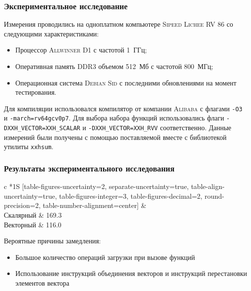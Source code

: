 \documentclass[aspectratio=169]{beamer}
\begin{document}
\begin{frame}
	\frametitle{Экспериментальное исследование}
	Измерения проводились на одноплатном компьютере \textsc{Sipeed Lichee RV 86} со следующими характеристиками:
	\begin{itemize}
		\item Процессор \textsc{Allwinner D1} с частотой 1~ГГц;
		\item Оперативная память \textsc{DDR3} объемом 512~Мб с частотой 800~МГц;
		\item Операционная система \textsc{Debian Sid} с последними обновлениями на момент тестирования.
	\end{itemize}

	Для компиляции использовался компилятор от компании \textsc{Alibaba} с флагами \texttt{-O3} и \texttt{-march=rv64gcv0p7}.
	Для выбора набора функций использовались флаги \texttt{-DXXH\_VECTOR=XXH\_SCALAR} и \texttt{-DXXH\_VECTOR=XXH\_RVV} соответственно.
	Данные измерений были получены с помощью поставляемой вместе с библиотекой утилиты \texttt{xxhsum}.
\end{frame}

\begin{frame}
	\frametitle{Результаты экспериментального исследования}
	\begin{table}[h]
		\def\arraystretch{1.1}  %
		\setlength\tabcolsep{0.2em}
		\centering
		\caption{Сравнение производительности хеш-функции  на входных данных размером в 1000~Кб; числа приведены с относительной погрешностью 0.1\%}
		\begin{tabular}[C]{
				c
				*1{S
							[table-figures-uncertainty=2, separate-uncertainty=true, table-align-uncertainty=true,
								table-figures-integer=3, table-figures-decimal=2, round-precision=2,
								table-number-alignment=center]
					}
			}
			\toprule
			 &  \\ \midrule
			Скалярный & 169.3 \\ \midrule
			Векторный & 116.0 \\
			\bottomrule
		\end{tabular}
		\label{tab:speed}
	\end{table}

	Вероятные причины замедления:
	\begin{itemize}
		\item Большое количество операций загрузки при вызове функций
		\item Использование инструкций объединения векторов и инструкций перестановки элементов вектора
	\end{itemize}
\end{frame}
\end{document}
